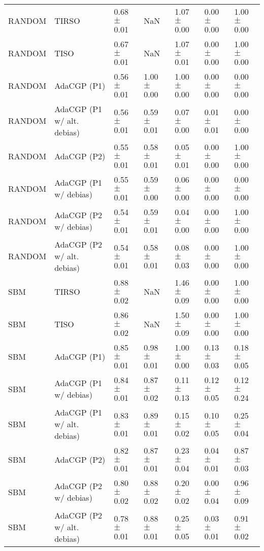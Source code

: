 \begin{tabular}{lllllll}
RANDOM & TIRSO & 0.68 $\pm$ 0.01 & NaN & 1.07 $\pm$ 0.00 & 0.00 $\pm$ 0.00 & 1.00 $\pm$ 0.00 \\
RANDOM & TISO & 0.67 $\pm$ 0.01 & NaN & 1.07 $\pm$ 0.01 & 0.00 $\pm$ 0.00 & 1.00 $\pm$ 0.00 \\
RANDOM & AdaCGP (P1) & 0.56 $\pm$ 0.01 & 1.00 $\pm$ 0.00 & 1.00 $\pm$ 0.00 & 0.00 $\pm$ 0.00 & 0.00 $\pm$ 0.00 \\
RANDOM & AdaCGP (P1 w/ alt. debias) & 0.56 $\pm$ 0.01 & 0.59 $\pm$ 0.01 & 0.07 $\pm$ 0.00 & 0.01 $\pm$ 0.01 & 0.00 $\pm$ 0.00 \\
RANDOM & AdaCGP (P2) & 0.55 $\pm$ 0.01 & 0.58 $\pm$ 0.01 & 0.05 $\pm$ 0.01 & 0.00 $\pm$ 0.00 & 1.00 $\pm$ 0.00 \\
RANDOM & AdaCGP (P1 w/ debias) & 0.55 $\pm$ 0.01 & 0.59 $\pm$ 0.00 & 0.06 $\pm$ 0.00 & 0.00 $\pm$ 0.00 & 0.00 $\pm$ 0.00 \\
RANDOM & AdaCGP (P2 w/ debias) & 0.54 $\pm$ 0.01 & 0.59 $\pm$ 0.01 & 0.04 $\pm$ 0.00 & 0.00 $\pm$ 0.00 & 1.00 $\pm$ 0.00 \\
RANDOM & AdaCGP (P2 w/ alt. debias) & 0.54 $\pm$ 0.01 & 0.58 $\pm$ 0.01 & 0.08 $\pm$ 0.03 & 0.00 $\pm$ 0.00 & 1.00 $\pm$ 0.00 \\
SBM & TIRSO & 0.88 $\pm$ 0.02 & NaN & 1.46 $\pm$ 0.09 & 0.00 $\pm$ 0.00 & 1.00 $\pm$ 0.00 \\
SBM & TISO & 0.86 $\pm$ 0.02 & NaN & 1.50 $\pm$ 0.09 & 0.00 $\pm$ 0.00 & 1.00 $\pm$ 0.00 \\
SBM & AdaCGP (P1) & 0.85 $\pm$ 0.01 & 0.98 $\pm$ 0.01 & 1.00 $\pm$ 0.00 & 0.13 $\pm$ 0.03 & 0.18 $\pm$ 0.05 \\
SBM & AdaCGP (P1 w/ debias) & 0.84 $\pm$ 0.01 & 0.87 $\pm$ 0.02 & 0.11 $\pm$ 0.13 & 0.12 $\pm$ 0.05 & 0.12 $\pm$ 0.24 \\
SBM & AdaCGP (P1 w/ alt. debias) & 0.83 $\pm$ 0.01 & 0.89 $\pm$ 0.01 & 0.15 $\pm$ 0.02 & 0.10 $\pm$ 0.05 & 0.25 $\pm$ 0.04 \\
SBM & AdaCGP (P2) & 0.82 $\pm$ 0.01 & 0.87 $\pm$ 0.01 & 0.23 $\pm$ 0.04 & 0.04 $\pm$ 0.01 & 0.87 $\pm$ 0.03 \\
SBM & AdaCGP (P2 w/ debias) & 0.80 $\pm$ 0.02 & 0.88 $\pm$ 0.02 & 0.20 $\pm$ 0.02 & 0.00 $\pm$ 0.04 & 0.96 $\pm$ 0.09 \\
SBM & AdaCGP (P2 w/ alt. debias) & 0.78 $\pm$ 0.01 & 0.88 $\pm$ 0.01 & 0.25 $\pm$ 0.05 & 0.03 $\pm$ 0.01 & 0.91 $\pm$ 0.02 \\
\bottomrule
\end{tabular}
